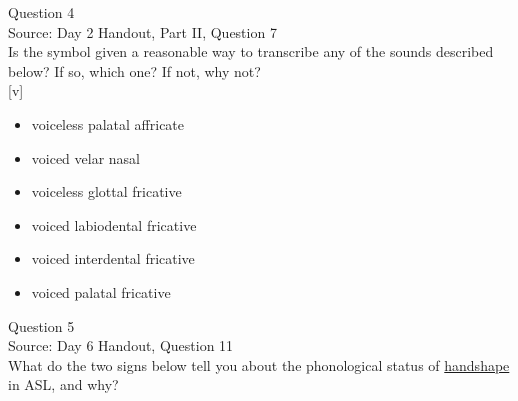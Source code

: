 \documentclass[12pt]{article}
\begin{document}
\newpage

{\large Question 4}\\

Source: Day 2 Handout, Part II, Question 7\\

Is the symbol given a reasonable way to transcribe any of the sounds described below? If so, which one? If not, why not?\\

{[v]}

\begin{itemize} \item voiceless palatal affricate \item voiced velar nasal \item voiceless glottal fricative \item voiced labiodental fricative \item voiced interdental fricative \item voiced palatal fricative \end{itemize}


\newpage

{\large Question 5}\\

Source: Day 6 Handout, Question 11\\

What do the two signs below tell you about the phonological status of \underline{handshape} in ASL, and why?\\
\end{document}
